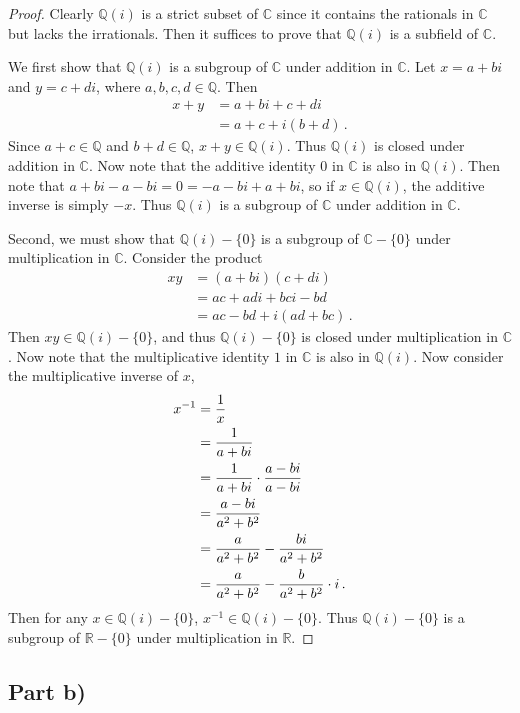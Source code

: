 \documentclass{abrice}
\newcommand{\R}{\mathbb{R}}
\newcommand{\Q}{\mathbb{Q}}
\renewcommand{\C}{\mathbb{C}}
\begin{document}
\begin{proof}
  Clearly $\Q(i)$ is a strict subset of $\C$ since it contains the rationals in
  $\C$ but lacks the irrationals. Then it suffices to prove that $\Q(i)$ is a
  subfield of $\C$.

  We first show that $\Q(i)$ is a subgroup of $\C$ under addition in $\C$. Let
  $x = a + bi$ and $y = c + di$, where $a,b,c,d \in \Q$. Then
  \begin{align*}
    x + y
    &= a + bi + c + di \\
    &= a + c + i(b + d)\, .
  \end{align*}
  Since $a + c \in \Q$ and $b + d \in \Q$, $x + y \in \Q(i)$. Thus $\Q(i)$ is
  closed under addition in $\C$. Now note that the additive identity $0$ in $\C$
  is also in $\Q(i)$. Then note that $a + bi - a - bi = 0 = - a - bi + a
  + bi$, so if $x \in \Q(i)$, the additive inverse is simply $-x$. Thus $\Q(i)$
  is a subgroup of $\C$ under addition in $\C$.

  Second, we must show that $\Q(i) - \{0\}$ is a subgroup of $\C - \{0\}$
  under multiplication in $\C$. Consider the product
  \begin{align*}
    xy
    &= (a + bi)(c + di) \\
    &= ac + adi + bci - bd \\
    &= ac - bd + i(ad + bc)\, .
  \end{align*}
  Then $xy \in \Q(i) - \{0\}$, and thus $\Q(i) - \{0\}$ is closed under
  multiplication in $\C$. Now note that the multiplicative identity $1$ in $\C$
  is also in $\Q(i)$. Now consider the multiplicative inverse of $x$,
  \begin{align*}
    x^{-1}
    &= {1 \over x} \\
    &= {1 \over a + bi} \\
    &= {1 \over a + bi} \cdot {a - bi \over a - bi} \\
    &= {a - bi \over a^2 + b^2} \\
    &= {a \over a^2 + b^2} - {bi \over a^2 + b^2} \\
    &= {a \over a^2 + b^2} - {b \over a^2 + b^2} \cdot i\, .
  \end{align*}
  Then for any $x \in \Q(i) - \{0\}$, $x^{-1} \in \Q(i) - \{0\}$. Thus $\Q(i) -
  \{0\}$ is a subgroup of $\R - \{0\}$ under multiplication in $\R$.
\end{proof}

\subsection{Part b)}
\end{document}
